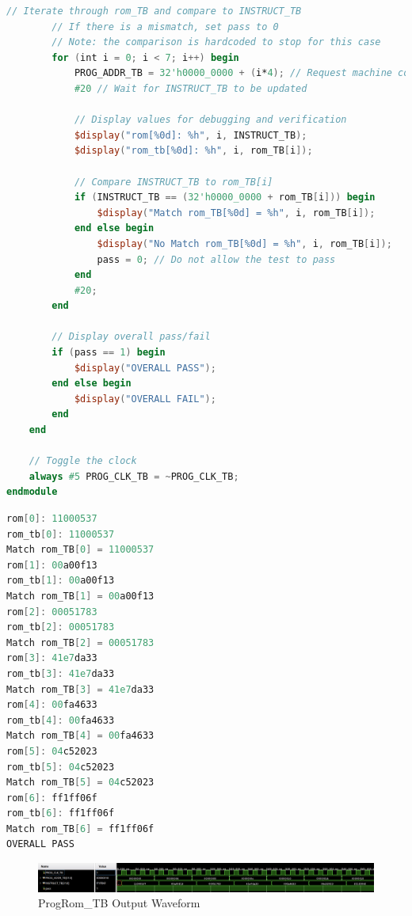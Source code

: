 \documentclass[
    a4paper, %
	12pt, %
    ]{CSSullivanBusinessReport}
\begin{document}
\begin{fullwidth}
\begin{lstlisting}[language=Verilog, caption=Verilog Testbench for ProgRom]
        // Iterate through rom_TB and compare to INSTRUCT_TB
        // If there is a mismatch, set pass to 0
        // Note: the comparison is hardcoded to stop for this case
        for (int i = 0; i < 7; i++) begin
            PROG_ADDR_TB = 32'h0000_0000 + (i*4); // Request machine code instruction from address
            #20 // Wait for INSTRUCT_TB to be updated

            // Display values for debugging and verification
            $display("rom[%0d]: %h", i, INSTRUCT_TB);
            $display("rom_tb[%0d]: %h", i, rom_TB[i]);

            // Compare INSTRUCT_TB to rom_TB[i]
            if (INSTRUCT_TB == (32'h0000_0000 + rom_TB[i])) begin
                $display("Match rom_TB[%0d] = %h", i, rom_TB[i]);
            end else begin
                $display("No Match rom_TB[%0d] = %h", i, rom_TB[i]);
                pass = 0; // Do not allow the test to pass
            end
            #20;
        end

        // Display overall pass/fail
        if (pass == 1) begin
            $display("OVERALL PASS");
        end else begin
            $display("OVERALL FAIL");
        end 
    end

    // Toggle the clock
    always #5 PROG_CLK_TB = ~PROG_CLK_TB;
endmodule
\end{lstlisting}




\begin{lstlisting}[language=Verilog, caption=TCl Output from ProgRom\_TB]
rom[0]: 11000537
rom_tb[0]: 11000537
Match rom_TB[0] = 11000537
rom[1]: 00a00f13
rom_tb[1]: 00a00f13
Match rom_TB[1] = 00a00f13
rom[2]: 00051783
rom_tb[2]: 00051783
Match rom_TB[2] = 00051783
rom[3]: 41e7da33
rom_tb[3]: 41e7da33
Match rom_TB[3] = 41e7da33
rom[4]: 00fa4633
rom_tb[4]: 00fa4633
Match rom_TB[4] = 00fa4633
rom[5]: 04c52023
rom_tb[5]: 04c52023
Match rom_TB[5] = 04c52023
rom[6]: ff1ff06f
rom_tb[6]: ff1ff06f
Match rom_TB[6] = ff1ff06f
OVERALL PASS
\end{lstlisting}

\begin{figure}[htbp]
    \centering
    \includegraphics[width=.80\pdfpagewidth]{Figures/ProgRom Simulation.png}
    \caption{ProgRom\_TB Output Waveform}
    \label{fig:ProgRom_TB_Output}
\end{figure}


\end{fullwidth}
\end{document}
